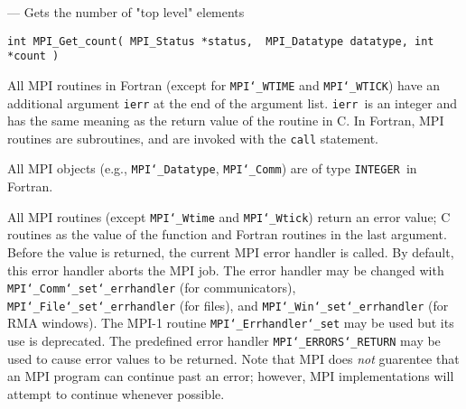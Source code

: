 \startmanpage
{}
--- Gets the number of "top level" elements 
\startvb\begin{verbatim}
int MPI_Get_count( MPI_Status *status,  MPI_Datatype datatype, int *count )

\end{verbatim}
\endvb

\par
{}
\par
{}
All MPI routines in Fortran (except for {\tt MPI{\tt \char`\_}WTIME} and {\tt MPI{\tt \char`\_}WTICK}) have
an additional argument {\tt ierr} at the end of the argument list.  {\tt ierr
}is an integer and has the same meaning as the return value of the routine
in C.  In Fortran, MPI routines are subroutines, and are invoked with the
{\tt call} statement.
\par
All MPI objects (e.g., {\tt MPI{\tt \char`\_}Datatype}, {\tt MPI{\tt \char`\_}Comm}) are of type {\tt INTEGER
}in Fortran.
\par
{}
\par
All MPI routines (except {\tt MPI{\tt \char`\_}Wtime} and {\tt MPI{\tt \char`\_}Wtick}) return an error value;
C routines as the value of the function and Fortran routines in the last
argument.  Before the value is returned, the current MPI error handler is
called.  By default, this error handler aborts the MPI job.  The error handler
may be changed with {\tt MPI{\tt \char`\_}Comm{\tt \char`\_}set{\tt \char`\_}errhandler} (for communicators),
{\tt MPI{\tt \char`\_}File{\tt \char`\_}set{\tt \char`\_}errhandler} (for files), and {\tt MPI{\tt \char`\_}Win{\tt \char`\_}set{\tt \char`\_}errhandler} (for
RMA windows).  The MPI-1 routine {\tt MPI{\tt \char`\_}Errhandler{\tt \char`\_}set} may be used but
its use is deprecated.  The predefined error handler
{\tt MPI{\tt \char`\_}ERRORS{\tt \char`\_}RETURN} may be used to cause error values to be returned.
Note that MPI does {\em not} guarentee that an MPI program can continue past
an error; however, MPI implementations will attempt to continue whenever
possible.
\par
{}
\endmanpage
